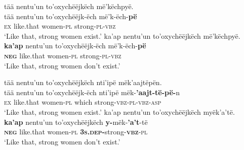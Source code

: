 \documentclass[output=paper,colorlinks,citecolor=brown,draft]{langscibook}
\begin{document}
\ea\label{ex:mix:60}
    \ea\label{ex:mix:60a}
        \glll  tää nentu’un to’oxychëëjkëch më’këchpyë. \\ 
              tää nentu’un to’oxychëëjk-ëch më’k-ëch-\textbf{pë}\\
              \textsc{ex} like.that women-\textsc{pl} strong-\textsc{pl-vbz} \\
        \glt ‘Like that, strong women exist.’    
    \ex\label{ex:mix:60b}
        \glll  ka’ap nentu’un to’oxychëëjkëch më’këchpyë. \\
             \textbf{ka’ap} nentu’un to’oxychëëjk-ëch më’k-ëch-\textbf{pë}\\
             \textbf{\textsc{neg}} like.that women-\textsc{pl} strong-\textsc{pl-vbz}\\
        \glt ‘Like that, strong women don’t exist.’
    \z
\z 
 
\ea\label{ex:mix:61}
    \ea\label{ex:mix:61a}
        \glll tää nentu’un to’oxychëëjkëch nti’ipë mëk’aajtëpën.\\ 
              tää nentu’un to’oxychëëjk-ëch nti’ipë mëk-\textbf{’aajt-të-pë-}n\\
              \textsc{ex} like.that women-\textsc{pl} which strong-\textsc{vbz-pl-vbz-asp}\\
        \glt ‘Like that, strong women exist.’     
    \ex\label{ex:mix:61b}
        \glll  ka’ap nentu’un to’oxychëëjkëch myëk’a’të.\\
             \textbf{ka’ap} nentu’un to’oxychëëjkëch \textbf{y-}mëk-\textbf{’a’t}{}-të\\
             \textbf{\textsc{neg}} like.that women-\textsc{pl} \textbf{\textsc{3s.dep}}\textbf{{}-}strong-\textbf{\textsc{vbz}}\textsc{{}-pl}\\
        \glt ‘Like that, strong women don’t exist.’
    \z
\z 
 
\ea\label{ex:mix:62}
    \z
\z 
 
\end{document}
